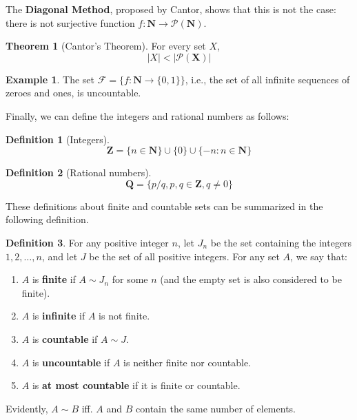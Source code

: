 \documentclass[12pt,a4paper]{article}
\theoremstyle{definition}
\newtheorem{theorem}{Theorem}[section]
\newtheorem{example}{Example}[section]
\newtheorem{definition}{Definition}[section]
\begin{document}
The \textbf{Diagonal Method}, proposed by Cantor, shows that this is not the case: there is not surjective function $f : \textbf{N} \longrightarrow \mathcal{P}(\textbf{N})$.

\begin{theorem}[Cantor's Theorem]
	For every set $X$, \[ | X | < | \mathcal{P}(\textbf{X}) | \]
\end{theorem}

\begin{example}
	The set $\mathcal{F} = \{ f: \textbf{N} \longrightarrow \{0, 1 \} \}$, i.e., the set of all infinite sequences of zeroes and ones, is uncountable.
\end{example}

Finally, we can define the integers and rational numbers as follows:

\begin{definition}[Integers]
	\[
		\textbf{Z} = \{ n \in \textbf{N} \} \cup \{ 0 \} \cup \{ -n : n \in \textbf{N} \}	
	\]
\end{definition}

\begin{definition}[Rational numbers]
	\[
		\textbf{Q} = \{ p/q, p,q \in \textbf{Z}, q \neq 0 \}
	\]
\end{definition}

These definitions about finite and countable sets can be summarized in the following definition.

\begin{definition}
	For any positive integer $n$, let $J_n$ be the set containing the integers $1, 2, \ldots, n$, and let $J$ be the set of all positive integers. For any set $A$, we say that:
	\begin{enumerate}
		\item $A$ is \textbf{finite} if $A \sim J_n$ for some $n$ (and the empty set is also considered to be finite).
		\item $A$ is \textbf{infinite} if $A$ is not finite.
		\item $A$ is \textbf{countable} if $A \sim J$.
		\item $A$ is \textbf{uncountable} if $A$ is neither finite nor countable.
		\item $A$ is \textbf{at most countable} if it is finite or countable.
	\end{enumerate}
\end{definition}

Evidently, $A \sim B$ iff. $A$ and $B$ contain the same number of elements.
\end{document}
